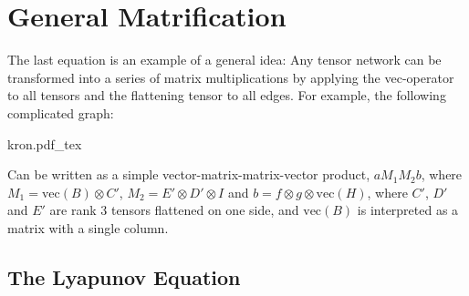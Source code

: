 
\section{General Matrification}

The last equation is an example of a general idea:
Any tensor network can be transformed into a series of matrix multiplications by applying the vec-operator to all tensors and the flattening tensor to all edges.
For example, the following complicated graph:
\begin{center}
   \def\svgwidth{.7\linewidth}
   {kron.pdf_tex}
\end{center}
Can be written as a simple vector-matrix-matrix-vector product, $a M_1 M_2 b$,
where $M_1 = \mathrm{vec}(B) \otimes C'$,
$M_2 = E' \otimes D' \otimes I$ and $b = f\otimes g\otimes \mathrm{vec}(H)$,
where $C'$, $D'$ and $E'$ are rank 3 tensors flattened on one side, and $\mathrm{vec}(B)$ is interpreted as a matrix with a single column.


\subsection{The Lyapunov Equation}

